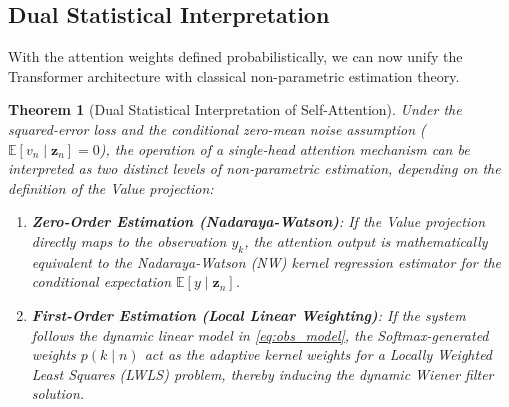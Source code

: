 \documentclass[conference]{IEEEtran}
\begin{document}
\subsection{Dual Statistical Interpretation}
With the attention weights defined probabilistically, we can now unify the Transformer architecture with classical non-parametric estimation theory. 

\newtheorem{theorem}{Theorem}
\begin{theorem}[Dual Statistical Interpretation of Self-Attention]
Under the squared-error loss and the conditional zero-mean noise assumption ($\mathbb{E}[v_n \mid \mathbf{z}_n]=0$), the operation of a single-head attention mechanism can be interpreted as two distinct levels of non-parametric estimation, depending on the definition of the Value projection:
\begin{enumerate}
    \item \textbf{Zero-Order Estimation (Nadaraya-Watson)}: If the Value projection directly maps to the observation $y_k$, the attention output is mathematically equivalent to the Nadaraya-Watson (NW) kernel regression estimator for the conditional expectation $\mathbb{E}[y \mid \mathbf{z}_n]$.
    \item \textbf{First-Order Estimation (Local Linear Weighting)}: If the system follows the dynamic linear model in \eqref{eq:obs_model}, the Softmax-generated weights $p(k \mid n)$ act as the adaptive kernel weights for a Locally Weighted Least Squares (LWLS) problem, thereby inducing the dynamic Wiener filter solution.
\end{enumerate}
\end{theorem}
\end{document}
